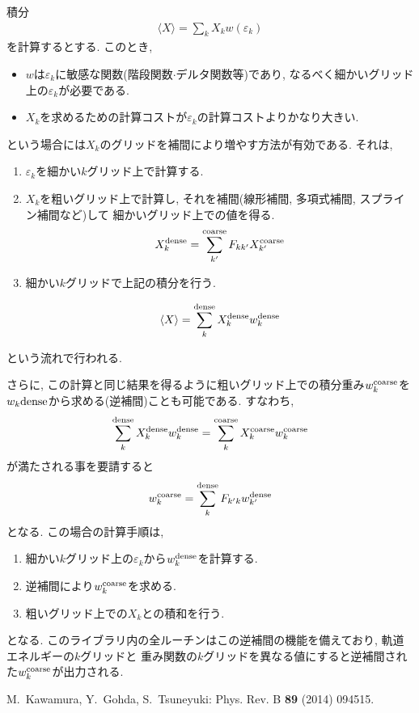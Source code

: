 \documentclass[12pt]{jarticle}
\begin{document}
積分
\begin{align}
\langle X \rangle = \sum_{k} X_k w(\varepsilon_k)
\end{align}
を計算するとする. 
このとき, 
\begin{itemize}
\item $w$は$\varepsilon_k$に敏感な関数(階段関数$\cdot$デルタ関数等)であり, 
なるべく細かいグリッド上の$\varepsilon_k$が必要である.
\item $X_k$を求めるための計算コストが$\varepsilon_k$の計算コストよりかなり大きい. 
\end{itemize}
という場合には$X_k$のグリッドを補間により増やす方法が有効である. 
それは, 
\begin{enumerate}
\item $\varepsilon_k$を細かい$k$グリッド上で計算する. 
\item $X_k$を粗いグリッド上で計算し, それを補間(線形補間, 多項式補間, スプライン補間など)して
  細かいグリッド上での値を得る. 
\begin{align}
X_k^{\rm dense} = \sum_{k'}^{\rm coarse} F_{k k'} X_{k'}^{\rm coarse}
\end{align}

\item 細かい$k$グリッドで上記の積分を行う. 

\begin{align}
\langle X \rangle = \sum_{k}^{\rm dense} X_k^{\rm dense} w_k^{\rm dense}
\end{align}
\end{enumerate}
という流れで行われる. 

 さらに, この計算と同じ結果を得るように粗いグリッド上での積分重み$w_k^{\rm coarse}$を 
$w_k{\rm dense}$から求める(逆補間)ことも可能である.  
すなわち, 
\begin{align}
\sum_k^{\rm dense} X_k^{\rm dense} w_k^{\rm dense}
=
\sum_k^{\rm coarse} X_k^{\rm coarse} w_k^{\rm coarse}
\end{align}
が満たされる事を要請すると
\begin{align}
w_k^{\rm coarse} = \sum_k^{\rm dense} F_{k ' k} w_{k'}^{\rm dense}
\end{align}
となる.
この場合の計算手順は, 
\begin{enumerate}
\item 細かい$k$グリッド上の$\varepsilon_k$から$w_k^{\rm dense}$を計算する. 
\item 逆補間により$w_k^{\rm coarse}$を求める. 
\item 粗いグリッド上での$X_k$との積和を行う. 
\end{enumerate}
となる. 
このライブラリ内の全ルーチンはこの逆補間の機能を備えており, 
軌道エネルギーの$k$グリッドと
重み関数の$k$グリッドを異なる値にすると逆補間された$w_k^{\rm coarse}$が出力される. 

\begin{thebibliography}{10}
M.~Kawamura, Y.~Gohda, S.~Tsuneyuki: Phys. Rev. B {\bfseries 89} (2014) 094515.
\end{thebibliography}
\end{document}
